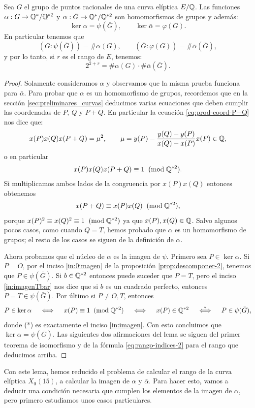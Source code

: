 \documentclass[../../tesis_maestria]{subfiles}
\begin{document}
\begin{lema}
	Sea $G$ el grupo de puntos racionales de una curva elíptica $E/\mathbb{Q}$. Las funciones $\alpha:G\rightarrow\mathbb{Q}^*/\mathbb{Q}^{*2}$ y $\bar{\alpha}:\bar{G}\rightarrow\mathbb{Q}^*/\mathbb{Q}^{*2}$ son homomorfismos de grupos y además:
	\[
		\ker\alpha=\psi(\bar{G}),\qquad \ker\bar{\alpha}=\varphi(G).
	\]
	En particular tenemos que
	\[
		(G:\psi(\bar{G}))=\#\alpha(G),\qquad (\bar{G}:\varphi(G))=\#\bar{\alpha}(\bar{G}),
	\]
	y por lo tanto, si $r$ es el rango de $E$, tenemos:
	\[
		2^{2+r}=\#\alpha(G)\cdot \#\bar{\alpha}(\bar{G}).
	\]
\end{lema}

\begin{proof}
Solamente consideramos $\alpha$ y observamos que la misma prueba funciona para $\bar{\alpha}$. Para probar que $\alpha$ es un homomorfismo de grupos, recordemos que en la sección \ref{sec:preliminares_curvas} deducimos varias ecuaciones que deben cumplir las coordenadas de $P$, $Q$ y $P+Q$. En particular la ecuación \ref{eq:prod-coord-P+Q} nos dice que:
\[
	x(P)x(Q)x(P+Q)=\mu^2,\qquad \mu=y(P)-\frac{y(Q)-y(P)}{x(Q)-x(P)}x(P)\in\mathbb{Q},
\]
o en particular
\[
	x(P)x(Q)x(P+Q)\equiv 1\;\;(\mathrm{mod}\; \mathbb{Q}^{*2}).
\]
Si multiplicamos ambos lados de la congruencia por $x(P)x(Q)$ entonces obtenemos
\[
	x(P+Q)\equiv x(P)x(Q)\;\;(\mathrm{mod}\; \mathbb{Q}^{*2}),
\]
porque $x(P)^2\equiv x(Q)^2\equiv1\;\;(\mathrm{mod}\; \mathbb{Q}^{*2})$ ya que $x(P),x(Q)\in\mathbb{Q}$. Salvo algunos pocos casos, como cuando $Q=T$, hemos probado que $\alpha$ es un homomorfismo de grupos; el resto de los casos se siguen de la definición de $\alpha$. 

Ahora probamos que el núcleo de $\alpha$ es la imagen de $\psi$. Primero sea $P\in\ker\alpha$. Si $P=O$, por el inciso \ref{in:0imagen} de la proposición \ref{prop:descomponer-2}, tenemos que $P\in\psi(\bar{G})$. Si $b\in\mathbb{Q}^{*2}$ entonces puede suceder que $P=T$, pero el inciso \ref{in:imagenTbar} nos dice que si $b$ es un cuadrado perfecto, entonces $P=T\in\psi(\bar{G})$. Por último si $P\neq O,T$, entonces
\[
	P\in\ker\alpha\quad\iff\quad x(P)\equiv 1\;\;(\mathrm{mod}\; \mathbb{Q}^{*2}) \quad\iff\quad x(P)\in\mathbb{Q}^{*2} \quad\overset{*}{\iff}\quad P\in\psi(\bar{G}),
\]
donde (*) es exactamente el inciso \ref{in:imagen}. Con esto concluimos que $\ker\alpha=\psi(\bar{G})$. Las siguientes dos afirmaciones del lema se siguen del primer teorema de isomorfismo y de la fórmula \eqref{eq:rango-indices-2} para el rango que deducimos arriba. 
\end{proof}

Con este lema, hemos reducido el problema de calcular el rango de la curva elíptica $X_0(15)$, a calcular la imagen de $\alpha$ y $\bar{\alpha}$. Para hacer esto, vamos a deducir una condición necesaria que cumplen los elementos de la imagen de $\alpha$, pero primero estudiamos unos casos particulares.
\end{document}
